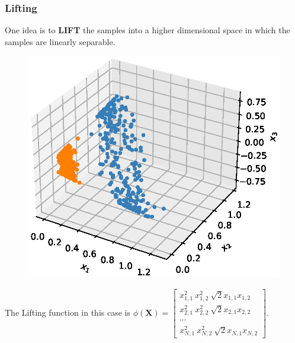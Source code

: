 \documentclass[10pt]{../formats/RU}
\begin{document}
\begin{frame}
  \frametitle{Lifting}
  One idea is to \textbf{LIFT} the samples into a higher dimensional space in which the samples are linearly separable.
  \begin{figure}
    \includegraphics[height=0.45\textheight]{./figs/3d_poly_circle.eps}%
  \end{figure}
  The Lifting function in this case is 
  $
  \phi(\mathbf{X}) = {
    \begin{bmatrix}
      x_{1,1}^2 \ x_{1,2}^2 \ \sqrt{2}x_{1,1}x_{1,2} \\
      x_{2,1}^2 \ x_{2,2}^2 \ \sqrt{2}x_{2,1}x_{2,2} \\
      \cdots \\
      x_{N,1}^2 \ x_{N,2}^2 \ \sqrt{2}x_{N,1}x_{N,2} 
    \end{bmatrix}
  }
  $.
\end{frame}
\end{document}
